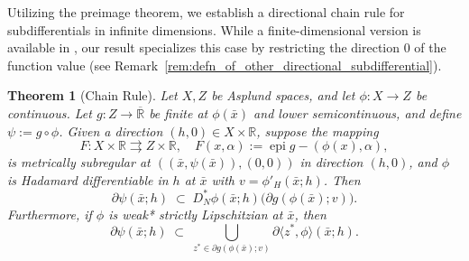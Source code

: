 \documentclass[12pt,twoside,reqno]{amsart}
\newtheorem{theorem}{Theorem}[section]
\theoremstyle{definition}
\numberwithin{equation}{section}
\begin{document}
Utilizing the preimage theorem, we establish a directional chain rule for subdifferentials in infinite dimensions. 
While a finite-dimensional version is available in \cite[Theorem~4.1]{benko2019calculus}, our result specializes this case by restricting the direction $0$ of the function value (see Remark~\ref{rem:defn_of_other_directional_subdifferential}).   

\begin{theorem}[Chain Rule]\label{thm: chain rule}
Let \( X, Z \) be Asplund spaces, and let \( \phi : X \to Z \) be continuous.  
Let \( g : Z \to \overline{\mathbb{R}} \) be finite at \( \phi(\bar{x}) \) and lower semicontinuous, and define \( \psi := g \circ \phi \).  
Given a direction \( (h, 0) \in X \times \mathbb{R} \), suppose the mapping
\[
    F : X \times \mathbb{R} \rightrightarrows Z \times \mathbb{R}, 
    \quad F(x, \alpha) := \operatorname{epi} g - (\phi(x), \alpha),
\]
is metrically subregular at \( ((\bar{x}, \psi(\bar{x})), (0,0)) \) in direction \( (h, 0) \), and $\phi$ is Hadamard differentiable in $h$ at $\bar x$ with \( v = \phi'_H(\bar{x}; h) \).  
Then
\begin{equation}\label{eq:chain_rule_unscalarized}
    \partial \psi(\bar{x}; h)
    \;\subset\;
    D^*_N \phi(\bar{x}; h) \big( \partial g(\phi(\bar{x}); v)\big).
\end{equation}
Furthermore, if $\phi$ is weak* strictly Lipschitzian at $\bar{x}$, then 
\begin{equation}\label{eq:chain_rule}
    \partial \psi(\bar{x}; h)
    \;\subset\;\bigcup\limits_{z^*\in \partial g(\phi(\bar{x}); v)} \partial \langle z^*, \phi\rangle(\bar{x}; h).
\end{equation}
\end{theorem}
\end{document}
